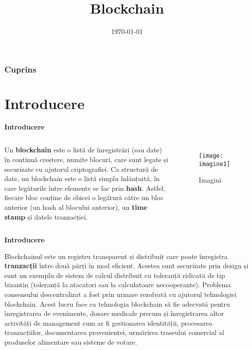 \documentclass[black]{beamer}
\title {\textbf {Blockchain}}
\date{\today}
\begin{document}
	\begin{frame}[plain]
		\maketitle
	\end{frame}
	
	\begin{frame}
		\begin{center}	
			\frametitle{\textbf{Cuprins}}
			\tableofcontents
		\end{center}
	\end{frame}
	\section{Introducere}
	\begin{frame} 
		\begin{block}{\textbf{Introducere}}
			
			
			\begin{columns}[onlytextwidth,T]
				\column{\dimexpr\linewidth-30mm-15mm}
				Un \textbf{blockchain} este o listă de înregistrări (sau date) în continuă creștere, numite blocuri, care sunt legate și securizate cu ajutorul criptografiei. Ca structură de date, un blockchain este o listă simplu înlănțuită, în care legăturile între elemente se fac prin \textbf{hash}. Astfel, fiecare bloc conține de obicei o legătură către un bloc anterior (un hash al blocului anterior), un \textbf{time stamp} și datele tranzacției.
				\column{50mm}
				\begin{figure}[h]
					\centering
					\texttt{[image: imagine1]}
					\caption{Imagini}
					\label{fig:imagine}
				\end{figure}
				
		\end{columns}
			\end{block}
\end{frame}
\begin{frame}
	\begin{block}{\textbf{Introducere}}
		\par
		Blockchainul este un registru transparent și distribuit care poate înregistra \textbf{tranzacții} între două părți în mod eficient.
		Acestea sunt securizate prin design și sunt un exemplu de sistem de calcul distribuit cu toleranță ridicată de tip bizantin (toleranță la atacatori sau la calculatoare necooperante). Problema consensului descentralizat a fost prin urmare rezolvată cu ajutorul tehnologiei blockchain. Acest lucru face ca tehnologia blockchain să fie adecvată pentru înregistrarea de evenimente, dosare medicale precum și înregistrarea altor activități de management cum ar fi gestionarea identității, procesarea tranzacțiilor, documentarea provenienței, urmărirea traseului comercial al produselor alimentare sau sisteme de votare.
	\end{block}
\end{frame}
\end{document}
